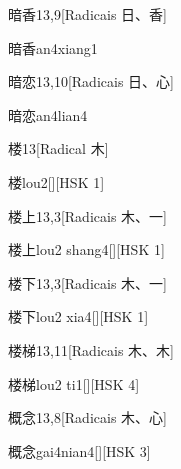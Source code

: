 \begin{entry}{暗香}{13,9}[Radicais ⽇、⾹]
  \begin{phonetics}{暗香}{an4xiang1}
  \end{phonetics}
\end{entry}

\begin{entry}{暗恋}{13,10}[Radicais ⽇、⼼]
  \begin{phonetics}{暗恋}{an4lian4}
  \end{phonetics}
\end{entry}

\begin{entry}{楼}{13}[Radical ⽊]
  \begin{phonetics}{楼}{lou2}[][HSK 1]
  \end{phonetics}
\end{entry}

\begin{entry}{楼上}{13,3}[Radicais ⽊、⼀]
  \begin{phonetics}{楼上}{lou2 shang4}[][HSK 1]
  \end{phonetics}
\end{entry}

\begin{entry}{楼下}{13,3}[Radicais ⽊、⼀]
  \begin{phonetics}{楼下}{lou2 xia4}[][HSK 1]
  \end{phonetics}
\end{entry}

\begin{entry}{楼梯}{13,11}[Radicais ⽊、⽊]
  \begin{phonetics}{楼梯}{lou2 ti1}[][HSK 4]
  \end{phonetics}
\end{entry}

\begin{entry}{概念}{13,8}[Radicais ⽊、⼼]
  \begin{phonetics}{概念}{gai4nian4}[][HSK 3]
  \end{phonetics}
\end{entry}

